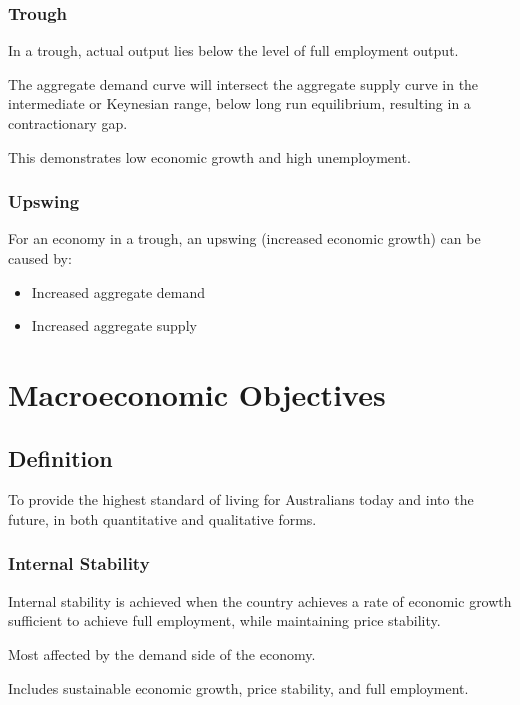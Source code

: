 \documentclass[a4paper,11pt]{report}
\begin{document}
\subsection{Trough}

In a trough, actual output lies below the level of full employment output.

The aggregate demand curve will intersect the aggregate supply curve in the
intermediate or Keynesian range, below long run equilibrium, resulting in a
contractionary gap.

This demonstrates low economic growth and high unemployment.

\subsection{Upswing}

For an economy in a trough, an upswing (increased economic growth) can be
caused by:

\begin{itemize}
\item Increased aggregate demand
\item Increased aggregate supply
\end{itemize}




\chapter{Macroeconomic Objectives}

\section{Definition}

To provide the highest standard of living for Australians today and into the
future, in both quantitative and qualitative forms.

\subsection{Internal Stability}

Internal stability is achieved when the country achieves a rate of economic
growth sufficient to achieve full employment, while maintaining price stability.

Most affected by the demand side of the economy.

Includes sustainable economic growth, price stability, and full employment.
\end{document}

